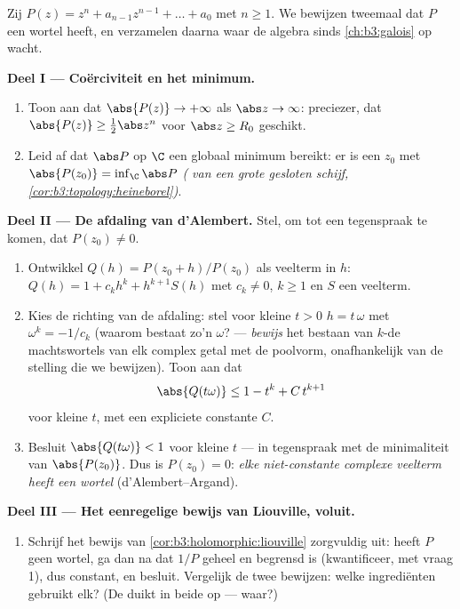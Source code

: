 \begin{problem}\label{pb:b3:holomorphic:1}
Zij $P(z) = z^n + a_{n-1}z^{n-1} + \dots + a_0$ met $n \geq 1$.
We bewijzen tweemaal dat $P$ een wortel heeft, en verzamelen
daarna waar de algebra sinds \cref{ch:b3:galois} op wacht.

\medskip
\noindent\textbf{Deel I --- Coërciviteit en het minimum.}
\begin{enumerate}
  \item Toon aan dat $\abs{P(z)} \to +\infty$ als $\abs z \to
        \infty$: preciezer, dat $\abs{P(z)} \geq \frac12\abs z^n$
        voor $\abs z \geq R_0$ geschikt.
  \item Leid af dat $\abs P$ op $\C$ een globaal minimum bereikt:
        er is een $z_0$ met $\abs{P(z_0)} = \inf_\C\abs P$
        \emph{( van een grote gesloten schijf,
        \cref{cor:b3:topology:heineborel})}.
\end{enumerate}

\medskip
\noindent\textbf{Deel II --- De afdaling van d'Alembert.} Stel,
om tot een tegenspraak te komen, dat $P(z_0) \neq 0$.
\begin{enumerate}[resume]
  \item Ontwikkel $Q(h) = P(z_0 + h)/P(z_0)$ als veelterm in $h$:
        $Q(h) = 1 + c_kh^k + h^{k+1}S(h)$ met $c_k \neq 0$, $k
        \geq 1$ en $S$ een veelterm.
  \item Kies de richting van de afdaling: stel voor kleine $t >
        0$ $h = t\,\omega$ met $\omega^k = -1/c_k$ (waarom
        bestaat zo'n $\omega$? --- \emph{bewijs} het bestaan van
        $k$-de machtswortels van elk complex getal met de
        poolvorm, onafhankelijk van de stelling die we bewijzen).
        Toon aan dat
        \[
        \abs{Q(t\omega)} \leq 1 - t^k + C\,t^{k+1}
        \]
        voor kleine $t$, met een expliciete constante $C$.
  \item Besluit $\abs{Q(t\omega)} < 1$ voor kleine $t$ --- in
        tegenspraak met de minimaliteit van $\abs{P(z_0)}$. Dus
        is $P(z_0) = 0$: \emph{elke niet-constante complexe
        veelterm heeft een wortel} (d'Alembert--Argand).
\end{enumerate}

\medskip
\noindent\textbf{Deel III --- Het eenregelige bewijs van
Liouville, voluit.}
\begin{enumerate}[resume]
  \item Schrijf het bewijs van
        \cref{cor:b3:holomorphic:liouville} zorgvuldig uit: heeft
        $P$ geen wortel, ga dan na dat $1/P$ geheel en begrensd
        is (kwantificeer, met vraag 1), dus constant, en besluit.
        Vergelijk de twee bewijzen: welke ingrediënten gebruikt
        elk? (De  duikt in beide op --- waar?)
\end{enumerate}


\end{problem}
